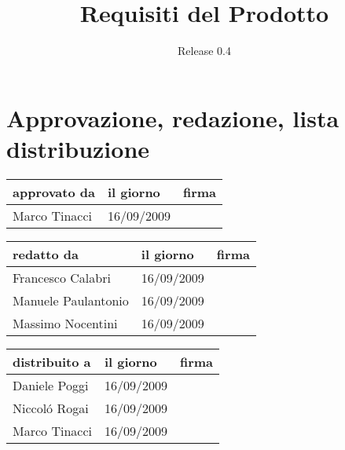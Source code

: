 \documentclass[a4paper, 12pt]{report}
\title{Requisiti del Prodotto}
\author{Release 0.4}
\date{\today \\Firenze \\\begin{figure}[h] \centering
\texttt{[image: ../images/logokiwi.png]} \end{figure} }
\begin{document}
\maketitle

\section*{Approvazione, redazione, lista distribuzione}
\begin{table}[h!]
  \begin{center}
    \begin{tabular}{| l | l | p{60mm} |}
    \hline
    \textbf{approvato da} & \textbf{il giorno} & \textbf{firma} \\
	\hline    
	Marco Tinacci & 16/09/2009 &  \\
    \hline
    \end{tabular}
  \end{center}
\end{table}

\begin{table}[h!]
  \begin{center}
    \begin{tabular}{| l | l | p{60mm} |}
    \hline
    \textbf{redatto da} & \textbf{il giorno} & \textbf{firma} \\
    \hline
    Francesco Calabri & 16/09/2009 &  \\
    \hline
	Manuele Paulantonio & 16/09/2009 &  \\
    \hline    
	Massimo Nocentini & 16/09/2009 &  \\
    \hline
    \end{tabular}
  \end{center}
\end{table}

\begin{table}[h!]
  \begin{center}
    \begin{tabular}{| l | l | p{60mm} |}
    \hline
    \textbf{distribuito a} & \textbf{il giorno} & \textbf{firma} \\
	\hline    
	Daniele Poggi & 16/09/2009 &  \\
    \hline
	Niccol\'o Rogai & 16/09/2009 &  \\
    \hline
	Marco Tinacci & 16/09/2009 &  \\
    \hline
    \end{tabular}
  \end{center}
\end{table}
\end{document}
